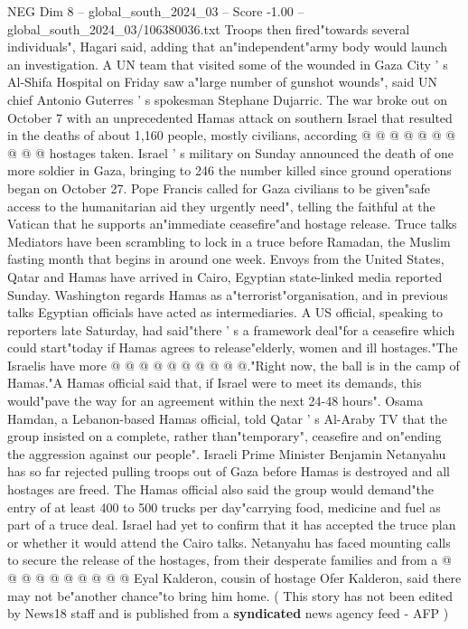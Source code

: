 \begin{textsample}{NEG Dim 8 – global\_south\_2024\_03 – Score -1.00 – global\_south\_2024\_03/106380036.txt}
Troops then fired"towards several individuals", Hagari said, adding that an"independent"army body would launch an investigation.
A UN team that visited some of the wounded in Gaza City ' s Al-Shifa Hospital on Friday saw a"large number of gunshot wounds", said UN chief Antonio Guterres ' s spokesman Stephane Dujarric.
The war broke out on October 7 with an unprecedented Hamas attack on southern Israel that resulted in the deaths of about 1,160 people, mostly civilians, according @ @ @ @ @ @ @ @ @ @ hostages taken.
Israel ' s military on Sunday announced the death of one more soldier in Gaza, bringing to 246 the number killed since ground operations began on October 27.
Pope Francis called for Gaza civilians to be given"safe access to the humanitarian aid they urgently need", telling the faithful at the Vatican that he supports an"immediate ceasefire"and hostage release.
Truce talks Mediators have been scrambling to lock in a truce before Ramadan, the Muslim fasting month that begins in around one week.
Envoys from the United States, Qatar and Hamas have arrived in Cairo, Egyptian state-linked media reported Sunday.
Washington regards Hamas as a"terrorist"organisation, and in previous talks Egyptian officials have acted as intermediaries.
A US official, speaking to reporters late Saturday, had said"there ' s a framework deal"for a ceasefire which could start"today if Hamas agrees to release"elderly, women and ill hostages."The Israelis have more @ @ @ @ @ @ @ @ @ @."Right now, the ball is in the camp of Hamas."A Hamas official said that, if Israel were to meet its demands, this would"pave the way for an agreement within the next 24-48 hours".
Osama Hamdan, a Lebanon-based Hamas official, told Qatar ' s Al-Araby TV that the group insisted on a complete, rather than"temporary", ceasefire and on"ending the aggression against our people".
Israeli Prime Minister Benjamin Netanyahu has so far rejected pulling troops out of Gaza before Hamas is destroyed and all hostages are freed.
The Hamas official also said the group would demand"the entry of at least 400 to 500 trucks per day"carrying food, medicine and fuel as part of a truce deal.
Israel had yet to confirm that it has accepted the truce plan or whether it would attend the Cairo talks.
Netanyahu has faced mounting calls to secure the release of the hostages, from their desperate families and from a @ @ @ @ @ @ @ @ @ @ Eyal Kalderon, cousin of hostage Ofer Kalderon, said there may not be"another chance"to bring him home. ( This story has not been edited by News18 staff and is published from a \textbf{syndicated} news agency feed - AFP )

\end{textsample}
